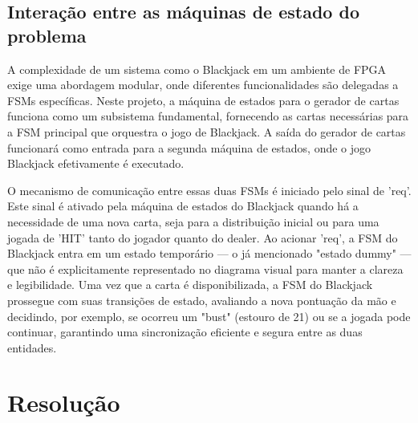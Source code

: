 \documentclass[oneside]{uffstex}
\begin{document}
\section{Interação entre as máquinas de estado do problema}
A complexidade de um sistema como o Blackjack em um ambiente de FPGA exige uma abordagem modular, onde diferentes funcionalidades são delegadas a FSMs específicas. Neste projeto, a máquina de estados para o gerador de cartas funciona como um subsistema fundamental, fornecendo as cartas necessárias para a FSM principal que orquestra o jogo de Blackjack. A saída do gerador de cartas funcionará como entrada para a segunda máquina de estados, onde o jogo Blackjack efetivamente é executado.


O mecanismo de comunicação entre essas duas FSMs é iniciado pelo sinal de 'req'. Este sinal é ativado pela máquina de estados do Blackjack quando há a necessidade de uma nova carta, seja para a distribuição inicial ou para uma jogada de 'HIT' tanto do jogador quanto do dealer. Ao acionar 'req', a FSM do Blackjack entra em um estado temporário — o já mencionado "estado dummy" — que não é explicitamente representado no diagrama visual para manter a clareza e legibilidade. Uma vez que a carta é disponibilizada, a FSM do Blackjack prossegue com suas transições de estado, avaliando a nova pontuação da mão e decidindo, por exemplo, se ocorreu um "bust" (estouro de 21) ou se a jogada pode continuar, garantindo uma sincronização eficiente e segura entre as duas entidades.
\chapter{Resolução}
\end{document}
